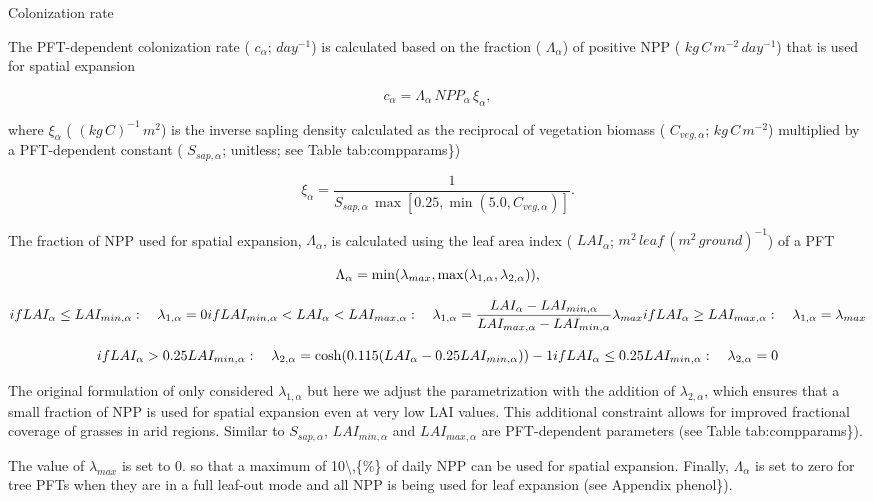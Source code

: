 Colonization rate

The P\+F\+T-\/dependent colonization rate ( $c_\alpha$; $day^{-1}$) is calculated based on the fraction ( $\Lambda_\alpha$) of positive N\+P\+P ( $kg\,C\,m^{-2}\,day^{-1}$) that is used for spatial expansion

\[ \label{c_a} c_\alpha = {\Lambda_\alpha\, NPP_\alpha\,\xi_{\alpha}}, \]

where $\xi_{\alpha}$ ( $(kg\,C)^{-1}\,m^{2}$) is the inverse sapling density calculated as the reciprocal of vegetation biomass ( $C_{veg,\alpha}$; $kg\,C\,m^{-2}$) multiplied by a P\+F\+T-\/dependent constant ( $S_{sap,\alpha}$; unitless; see Table tab\+:compparams\})

\[ \label{xi} \xi_{\alpha}=\frac{1}{S_{sap,\alpha}\,\max[0.25,\min(5.0, C_{veg,\alpha})]}. \]

The fraction of N\+P\+P used for spatial expansion, $\Lambda_\alpha$, is calculated using the leaf area index ( ${LAI}_\alpha$; $m^2\,leaf\,(m^{2}\,ground)^{-1}$) of a P\+F\+T

\[ \Lambda_{\alpha}=\min(\lambda_{max}, \max (\lambda_{1,\alpha}, \lambda_{2,\alpha})), \vspace*{-4mm} \]

\[ if LAI_\alpha \leq LAI_{min,\alpha}:\nonumber \\ \quad \lambda_{1,\alpha} =0 \nonumber \\ if LAI_{min,\alpha} < LAI_\alpha < LAI_{max,\alpha}:\nonumber \\ \quad \lambda_{1,\alpha} =\frac{LAI_\alpha - LAI_{min,\alpha}} {LAI_{max,\alpha} - LAI_{min,\alpha}} \lambda_{max} \nonumber \\ if LAI_\alpha \geq LAI_{max,\alpha}:\nonumber \\ \quad \lambda_{1,\alpha} =\lambda_{max} \label{lam1} \vspace*{-4mm} \]

\[ if LAI_\alpha > 0.25 LAI_{min,\alpha}:\nonumber \\ \quad \lambda_{2,\alpha} =\cosh(0.115(LAI_\alpha - 0.25 LAI_{min,\alpha})) - 1 \nonumber \\ if LAI_\alpha \leq 0.25 LAI_{min,\alpha}: \nonumber \\ \quad \lambda_{2,\alpha} = 0\label{lam2} \]

The original formulation of \cite{Arora2006-pp} only considered $\lambda_{1,\alpha}$ but here we adjust the parametrization with the addition of $\lambda_{2,\alpha}$, which ensures that a small fraction of N\+P\+P is used for spatial expansion even at very low L\+A\+I values. This additional constraint allows for improved fractional coverage of grasses in arid regions. Similar to $S_{sap,\alpha}$, $LAI_{min,\alpha}$ and $LAI_{max,\alpha}$ are P\+F\+T-\/dependent parameters (see Table tab\+:compparams\}).

The value of $\lambda_{max}$ is set to 0. so that a maximum of 10\textbackslash{},\{\%\} of daily N\+P\+P can be used for spatial expansion. Finally, $\Lambda_\alpha$ is set to zero for tree P\+F\+Ts when they are in a full leaf-\/out mode and all N\+P\+P is being used for leaf expansion (see Appendix phenol\}). 